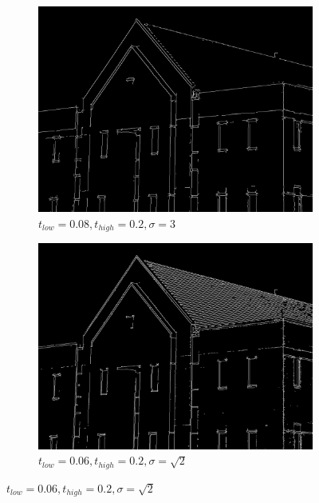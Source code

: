 \documentclass[a4paper]{article}
\begin{document}
\begin{figure}[h]
        \begin{subfigure}[b]{0.3\textwidth}
                \centering
                \includegraphics[width=\textwidth]{q2-house-canny-020083-my.png}
                \caption{$t_{low}=0.08, t_{high}=0.2, \sigma=3$}
                \label{fig:4d}
        \end{subfigure}
        \begin{subfigure}[b]{0.3\textwidth}
                \centering
                \includegraphics[width=\textwidth]{q2-house-canny-02006rt2-my.png}
                \caption{$t_{low}=0.06, t_{high}=0.2, \sigma=\sqrt{2}$}
                \label{fig:4e}
                

\end{subfigure}
\end{figure}
\end{document}
